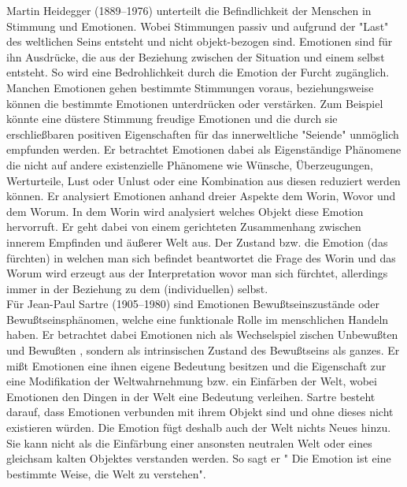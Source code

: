 Martin Heidegger (1889–1976) unterteilt die Befindlichkeit der Menschen in Stimmung und Emotionen. Wobei Stimmungen passiv und aufgrund der "Last" des weltlichen Seins entsteht und nicht objekt-bezogen sind. Emotionen sind für ihn Ausdrücke, die aus der Beziehung zwischen der Situation und einem selbst entsteht. So wird eine Bedrohlichkeit durch die Emotion der Furcht zugänglich. Manchen Emotionen gehen bestimmte Stimmungen voraus, beziehungsweise können die bestimmte Emotionen unterdrücken oder verstärken. Zum Beispiel könnte eine düstere Stimmung freudige Emotionen und die durch sie erschließbaren positiven Eigenschaften für das innerweltliche "Seiende" unmöglich empfunden werden. Er betrachtet Emotionen dabei als Eigenständige Phänomene die nicht auf andere existenzielle Phänomene wie Wünsche, Überzeugungen, Werturteile, Lust oder Unlust oder eine Kombination aus diesen reduziert werden können. Er analysiert Emotionen anhand dreier Aspekte dem Worin, Wovor und dem Worum. In dem Worin wird analysiert welches Objekt diese Emotion hervorruft. Er geht dabei von einem gerichteten Zusammenhang zwischen innerem Empfinden und äußerer Welt aus. Der Zustand bzw. die Emotion (das fürchten) in welchen man sich befindet beantwortet die Frage des Worin und das Worum wird erzeugt aus der Interpretation wovor man sich fürchtet, allerdings immer in der Beziehung zu dem (individuellen) selbst. \cite{barbara_merker_heidegger_2008}\\


Für Jean-Paul Sartre (1905–1980) sind Emotionen Bewußtseinszustände oder Bewußtseinsphänomen, welche eine funktionale Rolle im menschlichen Handeln haben. Er betrachtet dabei Emotionen nich als Wechselspiel zischen Unbewußten und Bewußten , sondern als intrinsischen Zustand des Bewußtseins als ganzes. Er mißt Emotionen eine ihnen eigene Bedeutung besitzen und die Eigenschaft zur eine Modifikation der Weltwahrnehmung bzw. ein Einfärben der Welt, wobei Emotionen den Dingen in der Welt eine Bedeutung verleihen. Sartre besteht darauf, dass Emotionen verbunden mit ihrem Objekt sind und ohne dieses nicht existieren würden. Die Emotion fügt deshalb auch der Welt nichts Neues 
hinzu.  Sie  kann  nicht  als  die  Einfärbung  einer  ansonsten  neutralen  Welt  
oder  eines  gleichsam  kalten  Objektes  verstanden  werden.
So sagt er "  Die  Emotion  ist  eine  bestimmte  Weise,  die  Welt  zu  verstehen".\cite{jean-pierre_wils_sartre:_2008} \\

